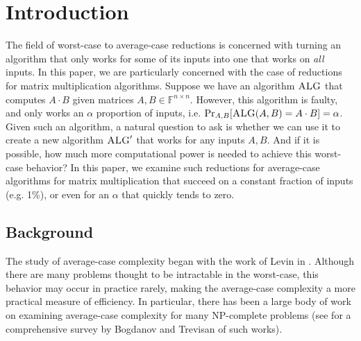 \documentclass[12pt]{caltech_thesis}
\def\F{\mathbb{F}}
\begin{document}
\begin{publishedcontent}%
\nocite{Cahn:etal:2015,Cahn:etal:2016}
\end{publishedcontent}

\tableofcontents
\listoffigures
\listoftables
\printnomenclature

\mainmatter

\chapter{Introduction}
The field of worst-case to average-case reductions  is concerned with turning an algorithm  that only works for some of its inputs into one that works on \textit{all} inputs. In this paper, we are particularly concerned with the case of reductions for matrix multiplication algorithms. Suppose we have an algorithm $\textsc{ALG}$ that computes $A\cdot B$ given matrices $A, B \in \F^{n \times n}$. However, this algorithm is faulty, and only works an $\alpha$ proportion of inputs, i.e. $\Pr_{A,B}[\textsc{ALG}(A,B) = A\cdot B] = \alpha$. Given such an algorithm, a natural question to ask is whether we can use it to create a new algorithm $\textsc{ALG}'$ that works for any inputs $A,B$. And if it is possible, how much more computational power is needed to achieve this worst-case behavior? In this paper, we examine such reductions for average-case algorithms for matrix multiplication that succeed on a constant fraction of inputs (e.g. 1\%), or even for an $\alpha$ that quickly tends to zero.



\section{Background}

The study of average-case complexity began with the work of Levin in \cite{Levin1986}. Although there are many problems thought to be intractable in the worst-case, this behavior may occur in practice rarely, making the average-case complexity a more practical measure of efficiency. In particular, there has been a large body of work on examining average-case complexity for many NP-complete problems (see \cite{bogdanov2021averagecase} for a comprehensive survey by Bogdanov and Trevisan of such works).
\end{document}
